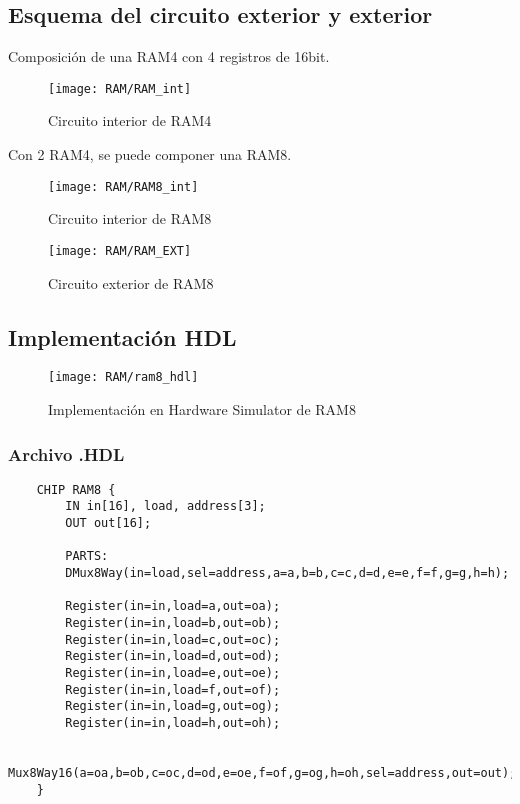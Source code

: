 \documentclass[12pt]{article}
\begin{document}
	\subsection{Esquema del circuito exterior y exterior}
	Composición de una RAM4 con 4 registros de 16bit.
	\begin{figure}[H]
	\centering
	\texttt{[image: RAM/RAM\_int]}
	\caption{Circuito interior de RAM4}
	\label{fig:ramint}
	\end{figure}

	Con 2 RAM4, se puede componer una RAM8.
	\begin{figure}[H]
	\centering
	\texttt{[image: RAM/RAM8\_int]}
	\caption{Circuito interior de RAM8}
	\label{fig:ram8int}
	\end{figure}


	\begin{figure}[H]
	\centering
	\texttt{[image: RAM/RAM\_EXT]}
	\caption{Circuito exterior de RAM8}
	\label{fig:ramext}
	\end{figure}


	\subsection{Implementación HDL}
	\begin{figure}[H]
	\centering
	\texttt{[image: RAM/ram8\_hdl]}
	\caption{Implementación en Hardware Simulator de RAM8}
	\label{fig:ram8hdl}
	\end{figure}

	\subsubsection{Archivo .HDL}
	\begin{lstlisting}
	CHIP RAM8 {
		IN in[16], load, address[3];
		OUT out[16];

		PARTS:
		DMux8Way(in=load,sel=address,a=a,b=b,c=c,d=d,e=e,f=f,g=g,h=h);

		Register(in=in,load=a,out=oa);
		Register(in=in,load=b,out=ob);
		Register(in=in,load=c,out=oc);
		Register(in=in,load=d,out=od);
		Register(in=in,load=e,out=oe);
		Register(in=in,load=f,out=of);
		Register(in=in,load=g,out=og);
		Register(in=in,load=h,out=oh);

		Mux8Way16(a=oa,b=ob,c=oc,d=od,e=oe,f=of,g=og,h=oh,sel=address,out=out);
	}
	\end{lstlisting}


	\newpage
\end{document}
